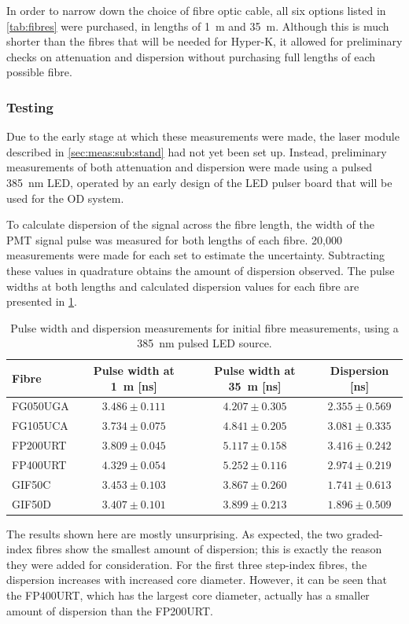 \documentclass[a4paper,11pt]{article}
\begin{document}
In order to narrow down the choice of fibre optic cable, all six options listed in \cref{tab:fibres} were purchased, in lengths of 1~m and 35~m. Although this is much shorter than the fibres that will be needed for Hyper-K, it allowed for preliminary checks on attenuation and dispersion without purchasing full lengths of each possible fibre.

\subsubsection{Testing}\label{sec:meas:sub:init:sub:test}

Due to the early stage at which these measurements were made, the laser module described in \cref{sec:meas:sub:stand} had not yet been set up. Instead, preliminary measurements of both attenuation and dispersion were made using a pulsed 385~nm LED, operated by an early design of the LED pulser board that will be used for the OD system.

To calculate dispersion of the signal across the fibre length, the width of the PMT signal pulse was measured for both lengths of each fibre. 20,000 measurements were made for each set to estimate the uncertainty. Subtracting these values in quadrature obtains the amount of dispersion observed. The pulse widths at both lengths and calculated dispersion values for each fibre are presented in \cref{tab:dispinit}.
\begin{table}[h]
\centering
\begin{tabular}{lccc}
\hline
Fibre	   & Pulse width at 1~m [ns]  & Pulse width at 35~m [ns] &  Dispersion [ns]		\\ \hline
FG050UGA   &  $3.486\pm0.111$	      &  $4.207\pm0.305$         &  $2.355\pm0.569$     \\
FG105UCA   &  $3.734\pm0.075$	      &  $4.841\pm0.205$ 		 &  $3.081\pm0.335$     \\
FP200URT   &  $3.809\pm0.045$	      &  $5.117\pm0.158$	   	 &  $3.416\pm0.242$     \\
FP400URT   &  $4.329\pm0.054$	      &  $5.252\pm0.116$ 		 &  $2.974\pm0.219$     \\
GIF50C     &  $3.453\pm0.103$    	  &  $3.867\pm0.260$ 	     &  $1.741\pm0.613$     \\
GIF50D     &  $3.407\pm0.101$		  &  $3.899\pm0.213$ 		 &  $1.896\pm0.509$     \\ \hline
\end{tabular}
\caption{Pulse width and dispersion measurements for initial fibre measurements, using a 385~nm pulsed LED source.}\label{tab:dispinit}
\end{table}
The results shown here are mostly unsurprising. As expected, the two graded-index fibres show the smallest amount of dispersion; this is exactly the reason they were added for consideration. For the first three step-index fibres, the dispersion increases with increased core diameter. However, it can be seen that the FP400URT, which has the largest core diameter, actually has a smaller amount of dispersion than the FP200URT.
\end{document}

